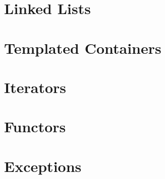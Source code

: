 \documentclass[english, 11pt]{article}
\begin{document}
\section{Linked Lists}
	

\section{Templated Containers}
	

\section{Iterators}
	

\section{Functors}
	

\section{Exceptions}
	
\end{document}
